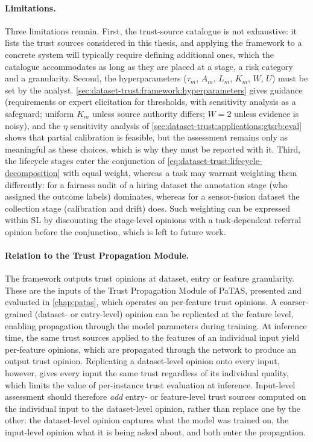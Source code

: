 \paragraph{Limitations.}
Three limitations remain. First, the trust-source catalogue is not exhaustive: it lists the trust sources considered in this thesis, and applying the framework to a concrete system will typically require defining additional ones, which the catalogue accommodates as long as they are placed at a stage, a risk category and a granularity. Second, the hyperparameters ($\tau_m$, $A_m$, $L_m$, $K_m$, $W$, $U$) must be set by the analyst. \cref{sec:dataset-trust:framework:hyperparameters} gives guidance (requirements or expert elicitation for thresholds, with sensitivity analysis as a safeguard; uniform $K_m$ unless source authority differs; $W = 2$ unless evidence is noisy), and the $\eta$ sensitivity analysis of \cref{sec:dataset-trust:applications:gtsrb:eval} shows that partial calibration is feasible, but the assessment remains only as meaningful as these choices, which is why they must be reported with it. Third, the lifecycle stages enter the conjunction of \cref{eq:dataset-trust:lifecycle-decomposition} with equal weight, whereas a task may warrant weighting them differently: for a fairness audit of a hiring dataset the annotation stage (who assigned the outcome labels) dominates, whereas for a sensor-fusion dataset the collection stage (calibration and drift) does. Such weighting can be expressed within \ac{SL} by discounting the stage-level opinions with a task-dependent referral opinion before the conjunction, which is left to future work.

\paragraph{Relation to the Trust Propagation Module.}
The framework outputs trust opinions at dataset, entry or feature granularity. These are the inputs of the Trust Propagation Module of \ac{PaTAS}, presented and evaluated in \cref{chap:patas}, which operates on per-feature trust opinions. A coarser-grained (dataset- or entry-level) opinion can be replicated at the feature level, enabling propagation through the model parameters during training. At inference time, the same trust sources applied to the features of an individual input yield per-feature opinions, which are propagated through the network to produce an output trust opinion. Replicating a dataset-level opinion onto every input, however, gives every input the same trust regardless of its individual quality, which limits the value of per-instance trust evaluation at inference. Input-level assessment should therefore \emph{add} entry- or feature-level trust sources computed on the individual input to the dataset-level opinion, rather than replace one by the other: the dataset-level opinion captures what the model was trained on, the input-level opinion what it is being asked about, and both enter the propagation.

